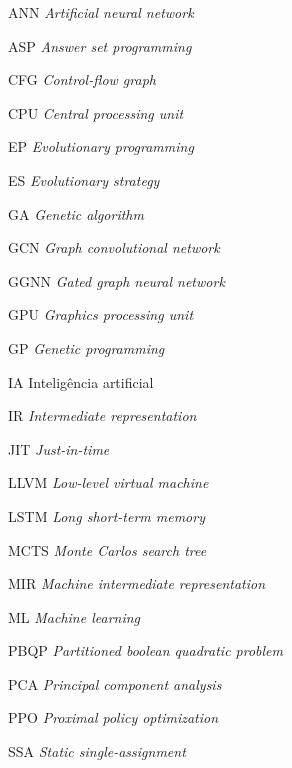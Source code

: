 \documentclass[
	12pt,				%
	openright,			%
	twoside,			%
	a4paper,			%
	tcc,			%
	]{ABNT-DC-UEL}
\begin{document}
\begin{siglas}
  \item[ANN] \textit{Artificial neural network}
  \item[ASP] \textit{Answer set programming}
  \item[CFG] \textit{Control-flow graph}
  \item[CPU] \textit{Central processing unit}
  \item[EP] \textit{Evolutionary programming}
  \item[ES] \textit{Evolutionary strategy}
  \item[GA] \textit{Genetic algorithm}
  \item[GCN] \textit{Graph convolutional network}
  \item[GGNN] \textit{Gated graph neural network}
  \item[GPU] \textit{Graphics processing unit}
  \item[GP] \textit{Genetic programming}
  \item[IA] Inteligência artificial
  \item[IR] \textit{Intermediate representation}
  \item[JIT] \textit{Just-in-time}
  \item[LLVM] \textit{Low-level virtual machine}
  \item[LSTM] \textit{Long short-term memory}
  \item[MCTS] \textit{Monte Carlos search tree}
  \item[MIR] \textit{Machine intermediate representation}
  \item[ML] \textit{Machine learning}
  \item[PBQP] \textit{Partitioned boolean quadratic problem}
  \item[PCA] \textit{Principal component analysis}
  \item[PPO] \textit{Proximal policy optimization}
  \item[SSA] \textit{Static single-assignment}
\end{siglas}
\end{document}
